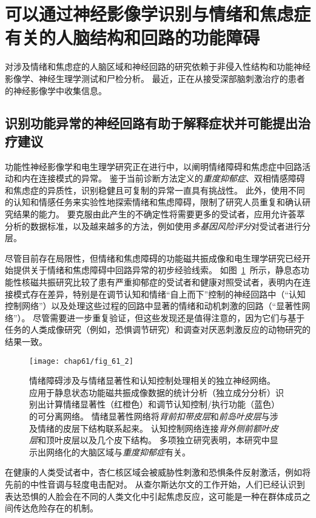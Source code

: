 \section{可以通过神经影像学识别与情绪和焦虑症有关的人脑结构和回路的功能障碍}

对涉及情绪和焦虑症的人脑区域和神经回路的研究依赖于非侵入性结构和功能神经影像学、神经生理学测试和尸检分析。
最近，正在从接受深部脑刺激治疗的患者的神经影像学中收集信息。



\subsection{识别功能异常的神经回路有助于解释症状并可能提出治疗建议}

功能性神经影像学和电生理学研究正在进行中，以阐明情绪障碍和焦虑症中回路活动和内在连接模式的异常。
鉴于当前诊断方法定义的\textit{重度抑郁症}、双相情感障碍和焦虑症的异质性，识别稳健且可复制的异常一直具有挑战性。
此外，使用不同的认知和情感任务来实验性地探索情绪和焦虑障碍，限制了研究人员重复和确认研究结果的能力。
要克服由此产生的不确定性将需要更多的受试者，应用允许荟萃分析的数据标准，以及越来越多的方法，例如使用\textit{多基因风险评分}对受试者进行分层。


尽管目前存在局限性，但情绪和焦虑障碍的功能磁共振成像和电生理学研究已经开始提供关于情绪和焦虑障碍中回路异常的初步经验线索。
如图~\ref{fig:61_2}~所示，静息态功能性核磁共振研究比较了患有严重抑郁症的受试者和健康对照受试者，表明内在连接模式存在差异，特别是在调节认知和情绪“自上而下”控制的神经回路中（“认知控制网络”）以及处理这些过程的回路中显著的情绪和动机刺激的回路（“显著性网络”）。
尽管需要进一步重复验证，但这些发现还是值得注意的，因为它们与基于任务的人类成像研究（例如，恐惧调节研究）和调查对厌恶刺激反应的动物研究的结果一致。


\begin{figure}[htbp]
	\centering
	\texttt{[image: chap61/fig\_61\_2]}
	\caption{情绪障碍涉及与情绪显著性和认知控制处理相关的独立神经网络。
		应用于静息状态功能磁共振成像数据的统计分析（独立成分分析）识别出计算情绪显著性（红橙色）和调节认知控制/执行功能（蓝色）的可分离网络。
		情绪显著性网络将\textit{背前扣带皮层}和\textit{前岛叶皮层}与涉及情绪的皮层下结构联系起来。
		认知控制网络连接\textit{背外侧前额叶皮层}和顶叶皮层以及几个皮下结构。
		多项独立研究表明，本研究中显示出网络化的大脑区域与\textit{重度抑郁症}有关\cite{seeley2007dissociable}。}
	\label{fig:61_2}
\end{figure}


在健康的人类受试者中，杏仁核区域会被威胁性刺激和恐惧条件反射激活，例如将先前的中性音调与轻度电击配对。
从查尔斯达尔文的工作开始，人们已经认识到表达恐惧的人脸会在不同的人类文化中引起焦虑反应，这可能是一种在群体成员之间传达危险存在的机制。


